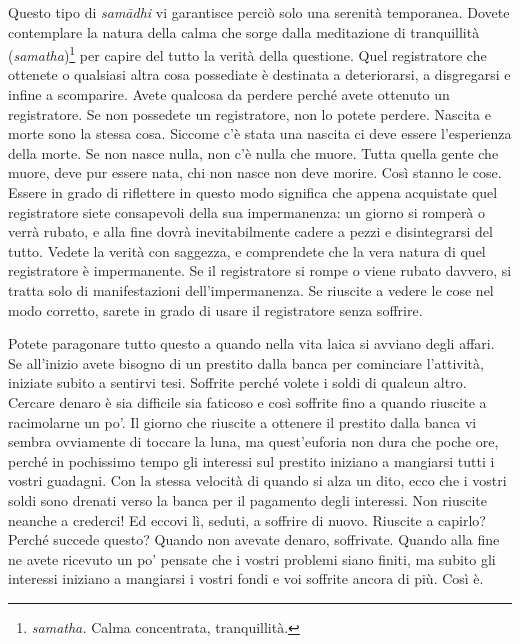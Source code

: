 Questo tipo di \emph{samādhi} vi garantisce perciò solo una serenità
temporanea. Dovete contemplare la natura della calma che sorge dalla
meditazione di tranquillità (\emph{samatha})\footnote{\emph{samatha.}
  Calma concentrata, tranquillità.} per capire del tutto la verità della
questione. Quel registratore che ottenete o qualsiasi altra cosa
possediate è destinata a deteriorarsi, a disgregarsi e infine a
scomparire. Avete qualcosa da perdere perché avete ottenuto un
registratore. Se non possedete un registratore, non lo potete perdere.
Nascita e morte sono la stessa cosa. Siccome c'è stata una nascita ci
deve essere l'esperienza della morte. Se non nasce nulla, non c'è nulla
che muore. Tutta quella gente che muore, deve pur essere nata, chi non
nasce non deve morire. Così stanno le cose. Essere in grado di
riflettere in questo modo significa che appena acquistate quel
registratore siete consapevoli della sua impermanenza: un giorno si
romperà o verrà rubato, e alla fine dovrà inevitabilmente cadere a pezzi
e disintegrarsi del tutto. Vedete la verità con saggezza, e comprendete
che la vera natura di quel registratore è impermanente. Se il
registratore si rompe o viene rubato davvero, si tratta solo di
manifestazioni dell'impermanenza. Se riuscite a vedere le cose nel modo
corretto, sarete in grado di usare il registratore senza soffrire.

Potete paragonare tutto questo a quando nella vita laica si avviano
degli affari. Se all'inizio avete bisogno di un prestito dalla banca per
cominciare l'attività, iniziate subito a sentirvi tesi. Soffrite perché
volete i soldi di qualcun altro. Cercare denaro è sia difficile sia
faticoso e così soffrite fino a quando riuscite a racimolarne un po'. Il
giorno che riuscite a ottenere il prestito dalla banca vi sembra
ovviamente di toccare la luna, ma quest'euforia non dura che poche ore,
perché in pochissimo tempo gli interessi sul prestito iniziano a
mangiarsi tutti i vostri guadagni. Con la stessa velocità di quando si
alza un dito, ecco che i vostri soldi sono drenati verso la banca per il
pagamento degli interessi. Non riuscite neanche a crederci! Ed eccovi
lì, seduti, a soffrire di nuovo. Riuscite a capirlo? Perché succede
questo? Quando non avevate denaro, soffrivate. Quando alla fine ne avete
ricevuto un po' pensate che i vostri problemi siano finiti, ma subito
gli interessi iniziano a mangiarsi i vostri fondi e voi soffrite ancora
di più. Così è.


